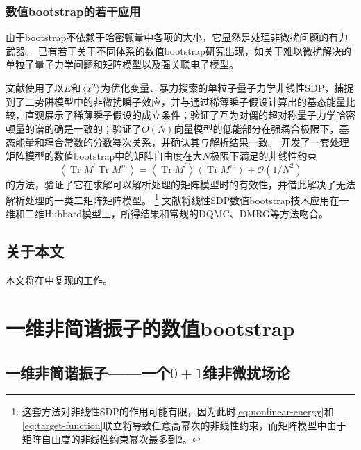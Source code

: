 \documentclass[oneside]{fduthesis}
\begin{document}
\subsection{数值bootstrap的若干应用}

由于bootstrap不依赖于哈密顿量中各项的大小，它显然是处理非微扰问题的有力武器。
已有若干关于不同体系的数值bootstrap研究出现，如关于难以微扰解决的单粒子量子力学问题和矩阵模型\cite{han_matrix,bhattacharya2021,kazakov2021analytic}以及强关联电子模型\cite{han_manybody}。

文献\parencite{bhattacharya2021}使用了以$E$和$\expval*{x^2}$为优化变量、暴力搜索的单粒子量子力学非线性SDP，捕捉到了二势阱模型中的非微扰瞬子效应，并与通过稀薄瞬子假设计算出的基态能量比较，直观展示了稀薄瞬子假设的成立条件；验证了互为对偶的超对称量子力学哈密顿量的谱的确是一致的；验证了$O(N)$向量模型的低能部分在强耦合极限下，基态能量和耦合常数的分数幂次关系，并确认其与解析结果一致。
\parencite{kazakov2021analytic}开发了一套处理矩阵模型的数值bootstrap中的矩阵自由度在大$N$极限下满足的非线性约束
\begin{equation}
    \left\langle\operatorname{Tr} M^{l} \operatorname{Tr} M^{m}\right\rangle=\left\langle\operatorname{Tr} M^{l}\right\rangle\left\langle\operatorname{Tr} M^{m}\right\rangle+\mathcal{O}\left(1 / N^{2}\right)
\end{equation}
的方法，验证了它在求解可以解析处理的矩阵模型时的有效性，并借此解决了无法解析处理的一类二矩阵矩阵模型。%
\footnote{这套方法对非线性SDP的作用可能有限，因为此时\eqref{eq:nonlinear-energy}和\eqref{eq:target-function}联立将导致任意高幂次的非线性约束，而矩阵模型中由于矩阵自由度的非线性约束幂次最多到2。}%
文献\parencite{han_manybody}将线性SDP数值bootstrap技术应用在一维和二维Hubbard模型上，所得结果和常规的DQMC、DMRG等方法吻合。

\section{关于本文}

本文将在中复现\parencite{han_matrix}的工作。

\chapter{一维非简谐振子的数值bootstrap}

\section{一维非简谐振子——一个$0+1$维非微扰场论}
\end{document}
